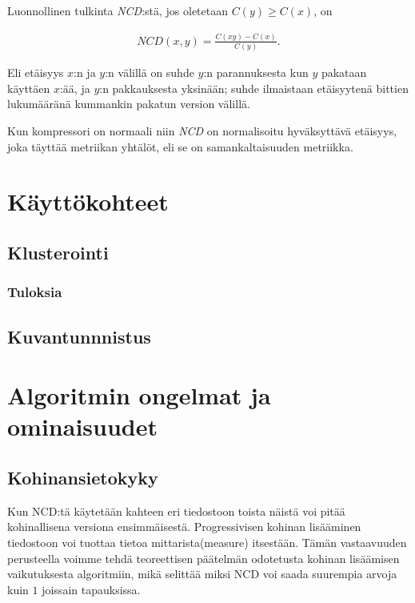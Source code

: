 \documentclass[11pt,finnish]{tktltiki2}
\theoremstyle{definition}
\theoremstyle{remark}
\begin{document}
  Luonnollinen tulkinta \emph{NCD}:stä, jos oletetaan $C(y) \geq C(x)$, on

  \begin{align}
    NCD(x,y) = \frac{C(xy)-C(x)}{C(y)}.
 \end{align}

  Eli etäisyys $x$:n ja $y$:n välillä on suhde $y$:n parannuksesta kun $y$ pakataan käyttäen $x$:ää, ja $y$:n pakkauksesta yksinään; suhde ilmaistaan etäisyytenä bittien lukumääränä kummankin pakatun version välillä.

  Kun kompressori on normaali niin \emph{NCD} on normalisoitu hyväksyttävä etäisyys, joka täyttää metriikan yhtälöt, eli se on samankaltaisuuden metriikka.



\section{Käyttökohteet} %
\label{sec:k_ytt_kohteet}
  \subsection{Klusterointi} %
  \label{sub:klusterointi}
    \subsubsection{Tuloksia} %
    \label{ssub:tuloksia}

  \subsection{Kuvantunnnistus} %
  \label{sub:kuvantunnnistus}


\section{Algoritmin ongelmat ja ominaisuudet} %
\label{sec:algoritmin_ongelmat_ja_ominaisuudet}
  \subsection{Kohinansietokyky} %
  \label{sub:kohinansietokyky}
    Kun NCD:tä käytetään kahteen eri tiedostoon toista näistä voi pitää kohinallisena versiona ensimmäisestä. Progressivisen kohinan lisääminen tiedostoon voi tuottaa tietoa mittarista(measure) itsestään. Tämän vastaavuuden perusteella voimme tehdä teoreettisen päätelmän odotetusta kohinan lisäämisen vaikutuksesta algoritmiin, mikä selittää miksi NCD voi saada suurempia arvoja kuin $1$ joissain tapauksissa. \cite{4167725}
\end{document}
